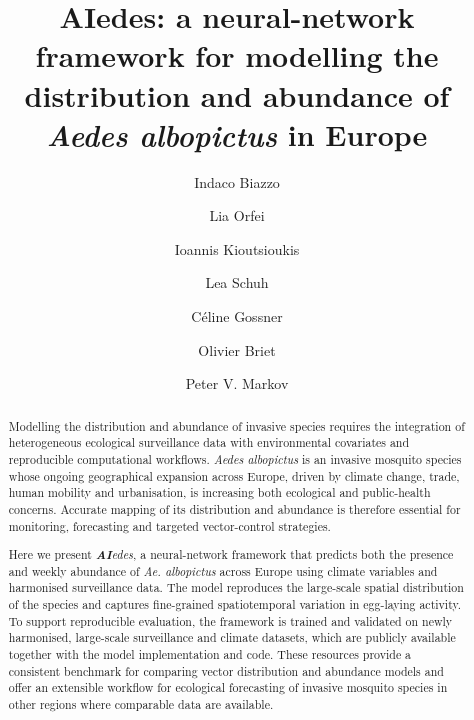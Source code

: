 \documentclass[preprint,12pt]{elsarticle}
\date{}
\begin{document}
\begin{frontmatter}

\title{AIedes: a neural-network framework for modelling the distribution and abundance of \textit{Aedes albopictus} in Europe}

\author[jrc]{Indaco Biazzo}

\author[jrc]{Lia Orfei}

\author[patras]{Ioannis Kioutsioukis}

\author[jrc]{Lea Schuh}

\author[ecdc]{Céline Gossner}

\author[ecdc]{Olivier Briet}

\author[jrc,lshtm]{Peter V. Markov}






\begin{abstract}
Modelling the distribution and abundance of invasive species requires the
integration of heterogeneous ecological surveillance data with environmental
covariates and reproducible computational workflows. \emph{Aedes albopictus}
is an invasive mosquito species whose ongoing geographical expansion across
Europe, driven by climate change, trade, human mobility and urbanisation, is
increasing both ecological and public-health concerns. Accurate mapping of its
distribution and abundance is therefore essential for monitoring, forecasting
and targeted vector-control strategies.

Here we present \textit{\textbf{AI}edes}, a neural-network framework that
predicts both the presence and weekly abundance of \emph{Ae. albopictus}
across Europe using climate variables and harmonised surveillance data. The
model reproduces the large-scale spatial distribution of the species and
captures fine-grained spatiotemporal variation in egg-laying activity. To
support reproducible evaluation, the framework is trained and validated on
newly harmonised, large-scale surveillance and climate datasets, which are
publicly available together with the model implementation and code. These
resources provide a consistent benchmark for comparing vector distribution
and abundance models and offer an extensible workflow for ecological
forecasting of invasive mosquito species in other regions where comparable
data are available.
\end{abstract}


\end{frontmatter}
\end{document}
